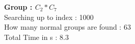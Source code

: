 \textbf{Group : $C_2*C_7$}\\
Searching up to index : 1000\\
How many normal groups are found : 63\\
Total Time in s : 8.3\\
